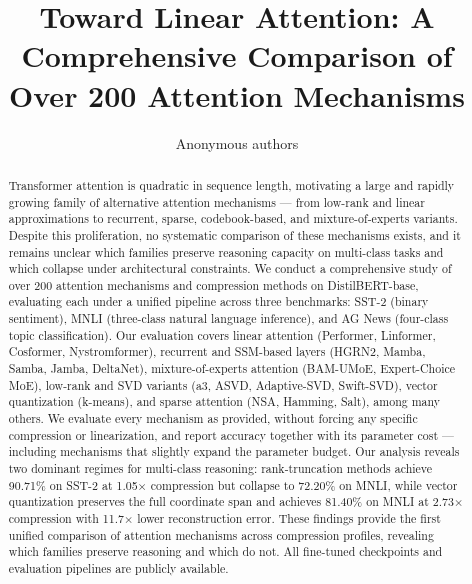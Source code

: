 \documentclass{article}
\title{Toward Linear Attention: A Comprehensive Comparison of Over 200 Attention Mechanisms}
\author{Anonymous authors}
\begin{document}
\maketitle

\begin{abstract}
Transformer attention is quadratic in sequence length, motivating a large and rapidly growing family of alternative attention mechanisms --- from low-rank and linear approximations to recurrent, sparse, codebook-based, and mixture-of-experts variants. Despite this proliferation, no systematic comparison of these mechanisms exists, and it remains unclear which families preserve reasoning capacity on multi-class tasks and which collapse under architectural constraints. We conduct a comprehensive study of over 200 attention mechanisms and compression methods on DistilBERT-base, evaluating each under a unified pipeline across three benchmarks: SST-2 (binary sentiment), MNLI (three-class natural language inference), and AG News (four-class topic classification). Our evaluation covers linear attention (Performer, Linformer, Cosformer, Nystromformer), recurrent and SSM-based layers (HGRN2, Mamba, Samba, Jamba, DeltaNet), mixture-of-experts attention (BAM-UMoE, Expert-Choice MoE), low-rank and SVD variants (a3, ASVD, Adaptive-SVD, Swift-SVD), vector quantization (k-means), and sparse attention (NSA, Hamming, Salt), among many others. We evaluate every mechanism as provided, without forcing any specific compression or linearization, and report accuracy together with its parameter cost --- including mechanisms that slightly expand the parameter budget. Our analysis reveals two dominant regimes for multi-class reasoning: rank-truncation methods achieve 90.71\% on SST-2 at 1.05$\times$ compression but collapse to 72.20\% on MNLI, while vector quantization preserves the full coordinate span and achieves 81.40\% on MNLI at 2.73$\times$ compression with 11.7$\times$ lower reconstruction error. These findings provide the first unified comparison of attention mechanisms across compression profiles, revealing which families preserve reasoning and which do not. All fine-tuned checkpoints and evaluation pipelines are publicly available.
\end{abstract}
\end{document}
